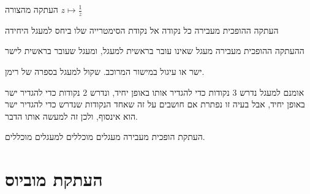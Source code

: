 \documentclass{tstextbook}
\begin{document}
\begin{definition}
העתקה מהצורה \(z\mapsto \frac{1}{z}\)

\end{definition}
\begin{proposition}
העתקה ההופכית מעבירה כל נקודה אל נקודת הסימטרייה שלו ביחס למעגל היחידה

\end{proposition}
\begin{proposition}
ההעתקה ההופכית מעבירה מעגל שאינו עובר בראשית למעגל, ומעגל שעובר בראשית לישר

\end{proposition}
\begin{definition}
ישר או עיגול במישור המרוכב. שקול למעגל בספרה של רימן.

\end{definition}
\begin{remark}
אומנם למעגל נדרש 3 נקודות כדי להגדיר אותו באופן יחיד, ונדרש 2 נקודות כדי להגדיר ישר באופן יחיד, אבל בעיה זו נפתרת אם חושבים על זה שאחד הנקודות שנדרש כדי להגדיר ישר הוא אינסוף, ולכן זה למעשה אותו הדבר.

\end{remark}
\begin{corollary}
העתקת הופכית מעבירה מעגלים מוכללים למעגלים מוכללים.

\end{corollary}
\section{העתקת מוביוס}
\end{document}
